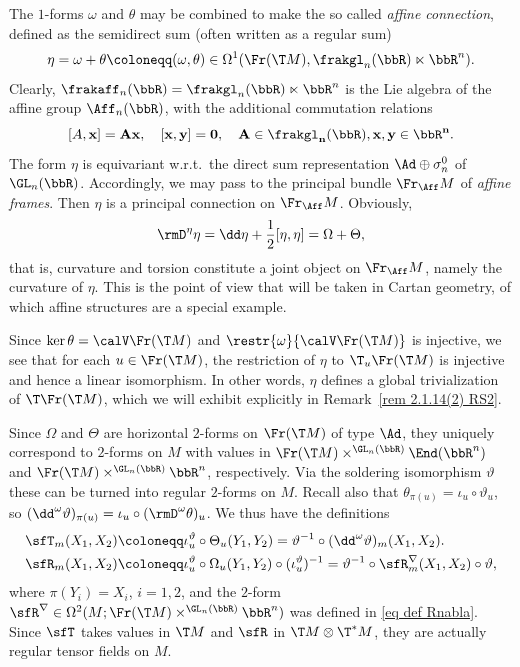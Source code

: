 \begin{rem}\label{rem 2.1.14(1) RS2}
    The $1$-forms $\omega$ and $\theta$  may be combined to make the so called \emph{affine connection}, defined as the semidirect sum (often written as a regular sum)
    \[\eta=\omega+\theta\coloneqq (\omega,\theta)\in \Omega^1(\Fr(\T M),\frakgl_n(\bbR)\ltimes\bbR^n).\]
    Clearly, $\frakaff_n(\bbR)=\frakgl_n(\bbR)\ltimes \bbR^n$ is the Lie algebra of the affine group $\Aff_n(\bbR)$, with the additional commutation relations
    \[[A,\bf{x}]=A\bf{x},\quad [\bf{x},\bf{y}]=0,\quad A\in\frakgl_n(\bbR),\bf{x},\bf{y}\in\bbR^n.\]
    The form $\eta$ is equivariant w.r.t.\ the direct sum representation $\Ad\oplus \sigma_n^0$ of $\GL_n(\bbR)$. Accordingly, we may pass to the principal bundle $\Fr_{\Aff} M$ of \emph{affine frames}. Then $\eta$ is a principal connection on $\Fr_{\Aff}M$. Obviously,
    \[\rmD^\eta\eta=\dd \eta+\frac12[\eta,\eta]=\Omega+\Theta,\]
    that is, curvature and torsion constitute a joint object on $\Fr_{\Aff} M$, namely the curvature of $\eta$. This is the point of view that will be taken in Cartan geometry, of which affine structures are a special example.

    Since $\ker\theta=\calV \Fr(\T M)$ and $\restr{\omega}{\calV \Fr(\T M)}$ is injective, we see that for each $u\in\Fr(\T M)$, the restriction of $\eta$ to $\T_u \Fr(\T M)$ is injective and hence a linear isomorphism. In other words, $\eta$ defines a global trivialization of $\T\Fr(\T M)$, which we will exhibit explicitly in Remark~\ref{rem 2.1.14(2) RS2}.
\end{rem}

Since $\Omega$ and $\Theta$ are horizontal $2$-forms on $\Fr(\T M)$ of type $\Ad$, they uniquely correspond to $2$-forms on $M$ with values in $\Fr(\T M)\times^{\GL_n(\bbR)}\End(\bbR^n)$ and $\Fr(\T M)\times^{\GL_n(\bbR)}\bbR^n$, respectively. Via the soldering isomorphism $\vartheta$ these can be turned into regular $2$-forms on $M$. Recall also that $\theta_{\pi(u)}=\iota_u\circ \vartheta_u$, so $(\dd^\omega \vartheta)_{\pi(u)}=\iota_u\circ (\rmD^\omega\theta)_u$. We thus have the definitions
\begin{align}
    \sfT_m(X_1,X_2)\coloneqq &\iota_u^\vartheta\circ \Theta_u(Y_1,Y_2)=\vartheta^{-1}\circ (\dd^\omega \vartheta)_m(X_1,X_2).\\
    \sfR_m(X_1,X_2)\coloneqq & \iota_u^\vartheta\circ \Omega_u(Y_1,Y_2)\circ (\iota_u^\vartheta)^{-1}=\vartheta^{-1}\circ \sfR^\nabla_m(X_1,X_2)\circ \vartheta,
\end{align}
where $\pi(Y_i)=X_i$, $i=1,2$, and the $2$-form $\sfR^\nabla\in\Omega^2(M;\Fr(\T M)\times^{\GL_n(\bbR)}\bbR^n)$ was defined in \eqref{eq def Rnabla}. Since $\sfT$ takes values in $\T M$ and $\sfR$ in $\T M\otimes \T^\ast M$, they are actually regular tensor fields on $M$.

